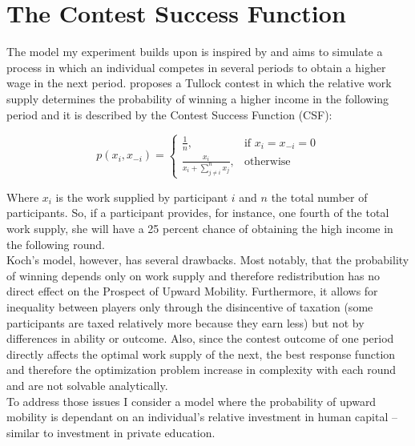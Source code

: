 \chapter{The Contest Success Function}
\label{ch:model}
\thispagestyle{fancy}

The model my experiment builds upon is inspired by \cite{koch2017} and aims to simulate a process in which an individual competes in several periods to obtain a higher wage in the next period. \cite{koch2017} proposes a Tullock contest in which the relative work supply determines the probability of winning a higher income in the following period and it is described by the Contest Success Function (CSF):

\begin{equation}
    p(x_i,x_{-i}) =
\begin{cases}
    \frac{1}{n},& \text{if } x_i = x_{-i} = 0\\
    \frac{x_i}{x_i + \sum_{j\neq i}^n x_{j}},              & \text{otherwise}
\end{cases}
\label{eq:csf}    
\end{equation}

\hfill \break

Where $x_i$ is the work supplied by participant $i$ and $n$ the total number of participants. So, if a participant provides, for instance, one fourth of the total work supply, she will have a 25 percent chance of obtaining the high income in the following round.\\

Koch's model, however, has several drawbacks. Most notably, that the probability of winning depends only on work supply and therefore redistribution has no direct effect on the Prospect of Upward Mobility. Furthermore, it allows for inequality between players only through the disincentive of taxation (some participants are taxed relatively more because they earn less) but not by differences in ability or outcome. Also, since the contest outcome of one period directly affects the optimal work supply of the next, the best response function and therefore the optimization problem increase in complexity with each round and are not solvable analytically.\\ 

To address those issues I consider a model where the probability of upward mobility is dependant on an individual's relative investment in human capital –similar to investment in private education.\\ 

